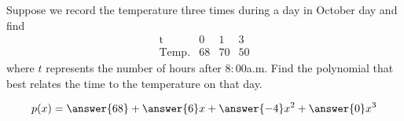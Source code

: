 \documentclass{ximera}
\author{Parisa Fatheddin}
\begin{document}
\begin{exercise}

Suppose we record the temperature three times during a day in October day and find
\[
\begin{array}{c|ccc}
\text{t} & 0 & 1 & 3\\
\text{Temp.} & 68 & 70 & 50
\end{array}
\]
where $t$ represents the number of hours after $8:00$a.m. Find the polynomial that best relates the time to the temperature on that day. 

\begin{prompt}
\[
p(x) = \answer{68} + \answer{6}x + \answer{-4}x^{2} + \answer{0}x^{3}
\]
\end{prompt}
\end{exercise}
\end{document}
